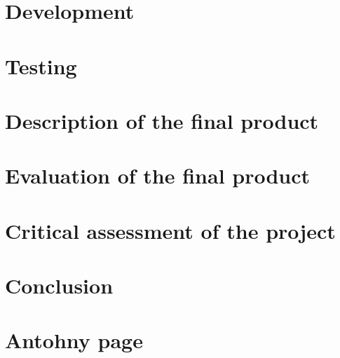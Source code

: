 \documentclass[11pt]{article}
\begin{document}
\newpage
\section{Development}

\newpage
\section{Testing}

\newpage
\section{Description of the final product}

\newpage
\section{Evaluation of the final product}

\newpage
\section{Critical assessment of the project }

\newpage
\section{Conclusion}


\newpage
\section{Antohny page}
\end{document}
